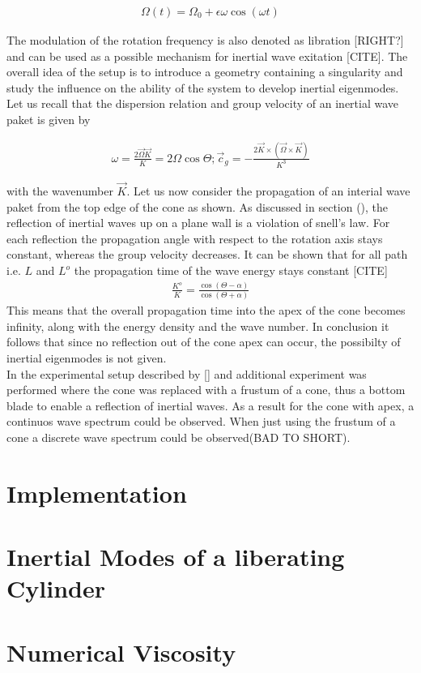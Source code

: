 \begin{align}
\Omega(t) = \Omega_0 + \epsilon \omega \cos(\omega t)
\end{align}

The modulation of the rotation frequency is also denoted as libration [RIGHT?] and can be used as a possible mechanism
for inertial wave exitation [CITE].
The overall idea of the setup is to introduce a geometry containing a singularity and study the influence on the ability of
the system to develop inertial eigenmodes.
Let us recall that the dispersion relation and group velocity of an inertial wave paket is given by

\begin{align}
    \omega = \frac{2\vec{\Omega}\vec{K}}{K} = 2 \Omega \cos\Theta ; \vec{c}_g = -\frac{2\vec{K}\times (\vec{\Omega} \times \vec{K})}{K^3}
\end{align}

with the wavenumber $\vec{K}$.
Let us now consider the propagation of an interial wave paket from the top edge of the cone as shown.
As discussed in section (), the reflection of inertial waves up on a  plane wall is a violation of snell's law.
For each reflection the propagation angle with respect to the rotation axis stays constant,
whereas the group velocity decreases.
It can be shown that for all path i.e. $L$ and $L^o$ the propagation time of the wave energy stays constant [CITE]
\begin{align}
    \frac{K^o}{K} = \frac{\cos(\Theta - \alpha)}{\cos(\Theta + \alpha)}
\end{align}
This means that the overall propagation time into the apex of the cone becomes infinity, along with the energy density and the wave number.
In conclusion it follows that since no reflection out of the cone apex can occur, the possibilty of inertial eigenmodes is not given.\\
In the experimental setup described by [] and additional experiment was performed where the cone was replaced with a frustum of a cone,
thus a bottom blade to enable a reflection of inertial waves.
As a result for the cone with apex, a continuos wave spectrum could be observed.
When just using the frustum of a cone a discrete wave spectrum could be observed(BAD TO SHORT).\\

\section{Implementation}

\section{Inertial Modes of a liberating Cylinder}


\section{Numerical Viscosity}
